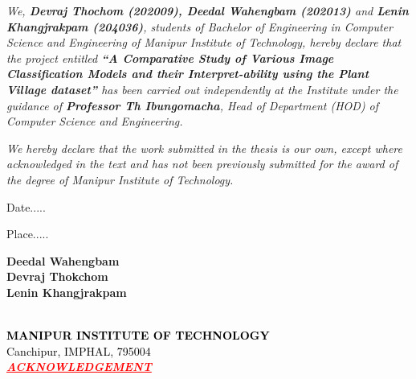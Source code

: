 \documentclass[12pt, oneside, a4paper]{book}
\begin{document}
\begingroup
    \justifying
    \textit{
    \color{black}\normalsize We, \textbf{Devraj Thochom (202009), Deedal Wahengbam (202013)} and \textbf{Lenin Khangjrakpam (204036)}, students  of Bachelor of Engineering in Computer Science and Engineering of Manipur Institute of Technology, hereby declare that the project entitled \textbf{\textit{``A Comparative Study of Various Image Classification Models and their Interpret-ability using the Plant Village dataset''}} has been carried out independently at the Institute under the guidance of \textbf{Professor Th Ibungomacha}, Head of Department (HOD) of Computer Science and Engineering.}
    \par\vspace{1em}
    \textit{We hereby declare that the work submitted in the thesis is our own, except where acknowledged in the text and has not been previously submitted for the award of the degree of Manipur Institute of Technology.}
    \par \vspace{12em}
\endgroup

\begingroup
    \begin{minipage}[c]{.5\textwidth}
    \RaggedRight
    \large Date.....  \par
    \large Place.....  \par
    \end{minipage}%
    \begin{minipage}[c]{.5\textwidth}
    \RaggedRight
    \normalsize \textbf{Deedal Wahengbam}\\
    \normalsize \textbf{Devraj Thokchom}\\
    \normalsize \textbf{Lenin Khangjrakpam}\\
    \end{minipage}    
\endgroup

\newpage
\begingroup
    \begin{center}
        \textcolor{black}
        {
        \color{red}\large {}\\
        \normalsize \textbf{MANIPUR INSTITUTE OF TECHNOLOGY}\\
        \normalsize Canchipur, IMPHAL, 795004\\[1em]
        }
        \textcolor{red}
        {
        \large \textit{\underline{\textbf{ACKNOWLEDGEMENT}}}
        }
    \end{center}
\endgroup
\end{document}
